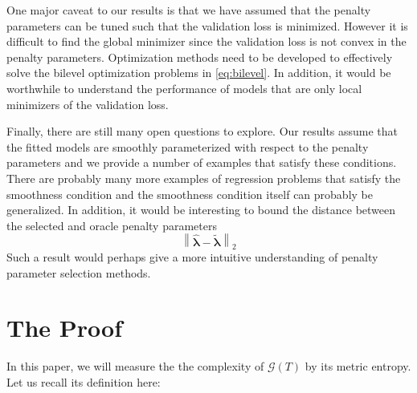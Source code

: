 \documentclass[12pt]{article}
\begin{document}
One major caveat to our results is that we have assumed that the penalty parameters can be tuned such that the validation loss is minimized. However it is difficult to find the global minimizer since the validation loss is not convex in the penalty parameters. Optimization methods need to be developed to effectively solve the bilevel optimization problems in \eqref{eq:bilevel}. In addition, it would be worthwhile to understand the performance of models that are only local minimizers of the validation loss.

Finally, there are still many open questions to explore. Our results assume that the fitted models are smoothly parameterized with respect to the penalty parameters and we provide a number of examples that satisfy these conditions. There are probably many more examples of regression problems that satisfy the smoothness condition and the smoothness condition itself can probably be generalized. In addition, it would be interesting to bound the distance between the selected and oracle penalty parameters
\begin{equation}
\label{penalty_diff}
\left \| \hat{\boldsymbol \lambda} - \tilde{\boldsymbol \lambda} \right \|_2
\end{equation}
Such a result would perhaps give a more intuitive understanding of penalty parameter selection methods.



\section{The Proof} \label{sec:proofs}

In this paper, we will measure the the complexity of $\mathcal{G}(T)$ by its metric entropy. Let us recall its definition here:
\end{document}
